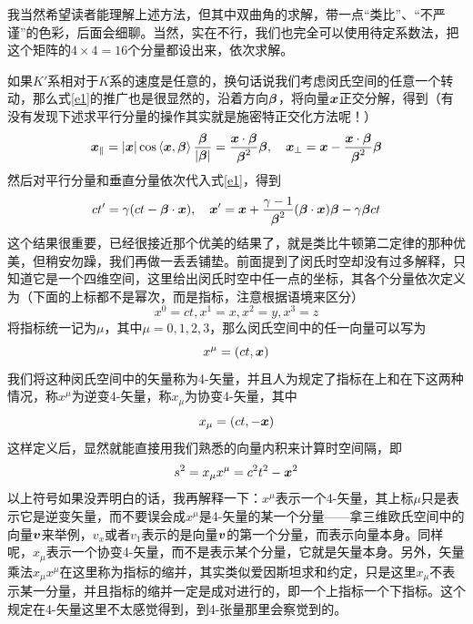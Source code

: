 \documentclass[12pt, a4paper, oneside]{ctexbook}
\begin{document}
我当然希望读者能理解上述方法，但其中双曲角的求解，带一点“类比”、“不严谨”的色彩，后面会细聊。当然，实在不行，我们也完全可以使用待定系数法，把这个矩阵的$4\times4=16$个分量都设出来，依次求解。\par 
如果$K'$系相对于$K$系的速度是任意的，换句话说我们考虑闵氏空间的任意一个转动，那么式\eqref{e1}的推广也是很显然的，沿着方向$\vb*{\beta}$，将向量$\vb*{x}$正交分解，得到（有没有发现下述求平行分量的操作其实就是施密特正交化方法呢！）
\begin{equation}
	\vb*{x}_{\parallel}=|\vb*{x}|\cos\left<\vb*{x},\vb*{\beta}\right>\dfrac{\vb*{\beta}}{|\vb*{\beta}|}=\dfrac{\vb*{x}\cdot\vb*{\beta}}{\vb*{\beta}^{2}}\vb*{\beta},\quad\vb*{x}_{\perp}=\vb*{x}-\dfrac{\vb*{x}\cdot\vb*{\beta}}{\vb*{\beta}^{2}}\vb*{\beta}
\end{equation}
然后对平行分量和垂直分量依次代入式\eqref{e1}，得到
\begin{equation}\label{e1.11}
	ct'=\gamma(ct-\vb*{\beta}\cdot\vb*{x}),\quad \vb*{x}'=\vb*{x}+\dfrac{\gamma-1}{\vb*{\beta}^{2}}(\vb*{\beta}\cdot\vb*{x})\vb*{\beta}-\gamma\vb*{\beta}ct
\end{equation}
这个结果很重要，已经很接近那个优美的结果了，就是类比牛顿第二定律的那种优美，但稍安勿躁，我们再做一丢丢铺垫。前面提到了闵氏时空却没有过多解释，只知道它是一个四维空间，这里给出闵氏时空中任一点的坐标，其各个分量依次定义为（下面的上标都不是幂次，而是指标，注意根据语境来区分）
\begin{equation}
	x^{0}=ct,x^{1}=x,x^{2}=y,x^{3}=z
\end{equation}
将指标统一记为$\mu$，其中$\mu=0,1,2,3$，那么闵氏空间中的任一向量可以写为
\begin{equation}
	x^{\mu}=(ct,\vb*{x})
\end{equation}
我们将这种闵氏空间中的矢量称为4-矢量，并且人为规定了指标在上和在下这两种情况，称$x^{\mu}$为逆变4-矢量，称$x_{\mu}$为协变4-矢量，其中
\begin{equation}
	x_{\mu}=(ct,-\vb*{x})
\end{equation}
这样定义后，显然就能直接用我们熟悉的向量内积来计算时空间隔，即
\begin{equation}
	s^{2}=x_{\mu}x^{\mu}=c^{2}t^{2}-\vb*{x}^{2}
\end{equation}
以上符号如果没弄明白的话，我再解释一下：$x^{\mu}$表示一个4-矢量，其上标$\mu$只是表示它是逆变矢量，而不要误会成$x^{\mu}$是4-矢量的某一个分量——拿三维欧氏空间中的向量$\vb*{v}$来举例，$v_{x}$或者$v_{1}$表示的是向量$\vb*{v}$的第一个分量，而表示向量本身。同样呢，$x_{\mu}$表示一个协变4-矢量，而不是表示某个分量，它就是矢量本身。另外，矢量乘法$x_{\mu}x^{\mu}$在这里称为指标的缩并，其实类似爱因斯坦求和约定，只是这里$x_{\mu}$不表示某一分量，并且指标的缩并一定是成对进行的，即一个上指标一个下指标。这个规定在4-矢量这里不太感觉得到，到4-张量那里会察觉到的。\par 
\end{document}
